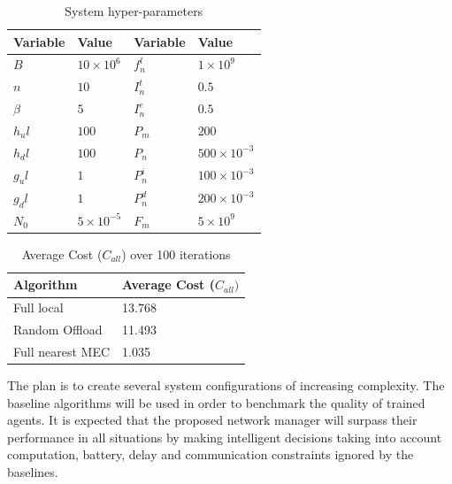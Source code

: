 \begin{table}[h]
\centering
\begin{tabular}{|l|l|l|l|}
\hline
Variable             & Value & Variable                & Value \\ \hline
$B$&$10\times10^{6}$&$f_n^l$&$1\times10^{9}$\\
$n$&$10$&$I_n^t$&$0.5$\\
$\beta$&$5$&$I_n^e$&$0.5$\\
$h_ul$&$100$& $P_m$&$200$\\
$h_dl$&$100$& $P_n$& $500\times10^{-3}$\\
$g_ul$&$1$&$P_n^i$&$100\times10^{-3}$\\
$g_dl$&$1$&$P_n^d$&$200\times10^{-3}$\\
$N_0$&$5\times10^{-5}$&$F_m$&$5\times10^{9}$\\ \hline
\end{tabular}
\caption{System hyper-parameters}\label{hyperparams}
\end{table}

\begin{table}[h]
\centering
\begin{tabular}{|l|l|}
\hline
Algorithm        & Average Cost ($C_{all})$ \\ \hline
Full local       & 13.768\\
Random Offload   & 11.493\\
Full nearest MEC & 1.035\\ \hline
\end{tabular}
\caption{Average Cost ($C_{all}$) over 100 iterations} \label{resultstest1}
\end{table}

The plan is to create several system configurations of increasing complexity. The baseline algorithms will be used in order to benchmark the quality of trained agents. It is expected that the proposed network manager will surpass their performance in all situations by making intelligent decisions taking into account computation, battery, delay and communication constraints ignored by the baselines.
